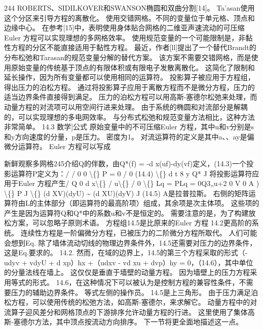 \documentclass[UTF8,11pt,a4paper,openany,fontset=fandol]{ctexbook}
\begin{document}
244 ROBERTS、SIDILKOVER和SWANSON椭圆和双曲分割[14]。 Ta'asan使用这个分区来引导方程的离散化。 使用交错网格。不同的变量位于单元格、顶点和边缘中心。 在参考[15]中，表明使用身体贴合网格的二维亚声速流动的可压缩Euler 方程可以实现理想的多网格效率。 使用规范变量的一个可能限制是，非黏性方程的分区不能直接适用于黏性方程。 最近，作者[ll]提出了一个替代Brandt的分布松弛和Tarasan的规范变量分解的替代方案。 该方案不需要交错网格，而是使用原始变量的传统基于顶点的有限体积或有限电子发散离散化。 这简化了限制和延长操作，因为所有变量都可以使用相同的运算符。 投影算子被应用于方程组，得出压力的泊松方程。 通过将投影算子应用于离散方程而不是微分方程，压力的适当边界条件直接得到满足。 压力的泊松方程可以用高斯-塞德尔松弛来处理，而动量方程的对流项可以用空间行进来处理。 由于系统的椭圆和对流部分是解耦的，可以实现理想的多电网效率。 与分布式松弛和规范变量方法相比，这种方法非常简单。 14.3 数学]公式 原始变量中的不可压缩Euler 方程，其中u和v分别是s和y方向速度的分量，p是压力。 密度为1。 对流运算符的定义是其中a、、ay是偏微分运算符。 Euler 方程可以写成

新鲜观察多网格245介绍Q的伴数，由Q*(f) = -d x(uf)-dy(vf)定义，(14.3)一个投影运算符P定义为：/ / 0 0 \textbackslash\{\} P = 0 / 0 (14.4) \textbackslash\{\} d t 8 y Q* J 将投影运算符应用于Euler 方程产生/ Q 0 d x\textbackslash\{\} / u\textbackslash\{\} / 0 \textbackslash\{\} Lq = PLq = 0Q3„u+2 0 V 0 A ) \textbackslash\{\} P J \textbackslash\{\} (d XV)(dyU) \textasciitilde{} (d XU)(dyV) J (14.5) A是拉普拉斯。 右侧的矩阵运算符由L的主体部分（即运算符的最高阶项）组成，其余项是次主体项。 这些项的产生是因为运算符Q和Q*中的系数u和v不是恒定的。 需要注意的是，为了构建放松方案，可以忽略子原则术语。 方程组14.5是比原来的Euler 方程 14.2更高阶的系统。 连续性方程是一阶偏微分方程，已被压力的二阶微分方程所取代。 人们可能会想到Eq. 除了墙体流动切线的物理边界条件外，14.5还需要对压力的边界条件，这是Eq.要求的。 14.2. 然而，在域的边界上，14.5的第三个方程采取的形式（-udyv + vdyU + d xp）hx +（udxv - vd xu + dvp）hy = 0，（14.6），其中单位的分量法线在墙上。 这仅仅是垂直于墙壁的动量方程。 因为墙壁上的压力方程采用等式的形式。 14.6，在这种情况下可以被认为是控制方程的兼容性条件，不需要压力的辅助边界条件。 等式左侧的操作员。 14.5是上三角形。 由于压力满足泊松方程，可以使用传统的松弛方法，如高斯-塞德尔，来求解它。 动量方程中的对流算子迎风差分和网格顶点的下游排序允许动量方程的行进。 这里使用了集体高斯-塞德尔方法，其中顶点按流动方向排序。 下一节将更全面地描述这一点。
\end{document}
